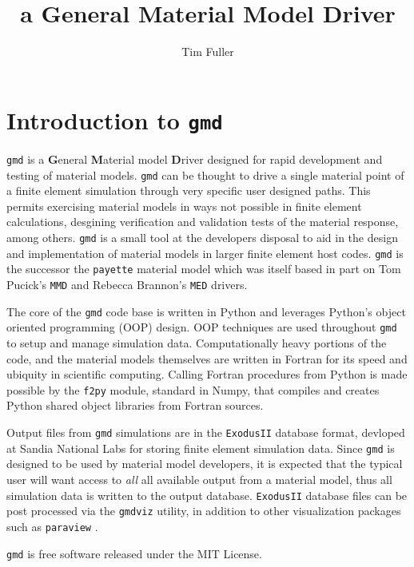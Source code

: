 \documentclass[11pt]{report}
\title{\gmd{} \\ a General Material Model Driver}
\author{Tim Fuller}
\newcommand{\gmd}{\texttt{gmd}}
\newcommand{\gmdviz}{\texttt{gmdviz}}
\newcommand{\exodusii}{{\sc\texttt{ExodusII}}}
\newcommand{\fpy}[1]{\texttt{f2py}}
\newcommand{\paraview}[1]{{\sc\texttt{paraview}}}
\begin{document}
\maketitle

\chapter{Introduction to \gmd}
\gmd{} is a \textbf{G}eneral \textbf{M}aterial model \textbf{D}river designed
for rapid development and testing of material models. \gmd{} can be thought to
drive a single material point of a finite element simulation through very
specific user designed paths. This permits exercising material models in ways
not possible in finite element calculations, desgining verification and
validation tests of the material response, among others. \gmd{} is a small
tool at the developers disposal to aid in the design and implementation of
material models in larger finite element host codes. \gmd{} is the successor
the \texttt{payette} material model \cite{payette} which was itself based in
part on Tom Pucick's \texttt{MMD} \cite{pucick} and Rebecca Brannon's
\texttt{MED} \cite{brandriver} drivers.

The core of the \gmd{} code base is written in Python and leverages Python's
object oriented programming (OOP) design. OOP techniques are used throughout
\gmd{} to setup and manage simulation data. Computationally heavy portions of
the code, and the material models themselves are written in Fortran for its
speed and ubiquity in scientific computing. Calling Fortran procedures from
Python is made possible by the \fpy{} module, standard in Numpy, that compiles
and creates Python shared object libraries from Fortran sources.

Output files from \gmd{} simulations are in the \exodusii{} \cite{exodus}
database format, devloped at Sandia National Labs for storing finite element
simulation data. Since \gmd{} is designed to be used by material model
developers, it is expected that the typical user will want access to
\emph{all} all available output from a material model, thus all simulation
data is written to the output database. \exodusii{} database files can be post
processed via the \gmdviz{} utility, in addition to other visualization
packages such as \paraview{} \cite{paraview}.

\gmd{} is free software released under the MIT License.

\end{document}
